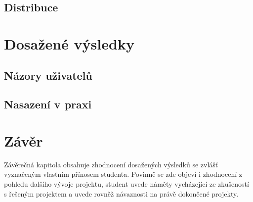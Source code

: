 \section{Distribuce}

\chapter{Dosažené výsledky}
\section{Názory uživatelů}
\section{Nasazení v praxi}

\chapter{Závěr}
Závěrečná kapitola obsahuje zhodnocení dosažených výsledků se zvlášť vyznačeným vlastním přínosem studenta. Povinně se zde objeví i zhodnocení z pohledu dalšího vývoje projektu, student uvede náměty vycházející ze zkušeností s řešeným projektem a uvede rovněž návaznosti na právě dokončené projekty.

